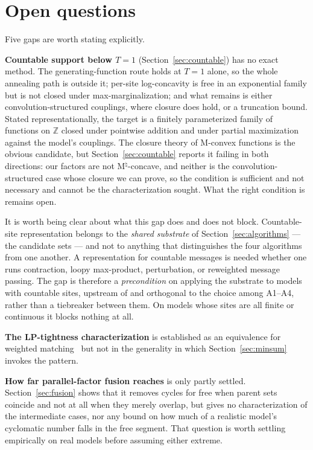 \section*{Open questions}

Five gaps are worth stating explicitly.

\textbf{Countable support below $T = 1$} (Section~\ref{sec:countable}) has no exact method. The generating-function route holds at $T = 1$ alone, so the whole annealing path is outside it; per-site log-concavity is free in an exponential family but is not closed under max-marginalization; and what remains is either convolution-structured couplings, where closure does hold, or a truncation bound. Stated representationally, the target is a finitely parameterized family of functions on $\mathbb{Z}$ closed under pointwise addition and under partial maximization against the model's couplings. The closure theory of M-convex functions is the obvious candidate, but Section~\ref{sec:countable} reports it failing in both directions: our factors are not M$^{\natural}$-concave, and neither is the convolution-structured case whose closure we can prove, so the condition is sufficient and not necessary and cannot be the characterization sought. What the right condition is remains open.

It is worth being clear about what this gap does and does not block. Countable-site representation belongs to the \emph{shared substrate} of Section~\ref{sec:algorithms} --- the candidate sets --- and not to anything that distinguishes the four algorithms from one another. A representation for countable messages is needed whether one runs contraction, loopy max-product, perturbation, or reweighted message passing. The gap is therefore a \emph{precondition} on applying the substrate to models with countable sites, upstream of and orthogonal to the choice among A1--A4, rather than a tiebreaker between them. On models whose sites are all finite or continuous it blocks nothing at all.

\textbf{The LP-tightness characterization} is established as an equivalence for weighted matching~\citep{Sanghavi2007} but not in the generality in which Section~\ref{sec:minsum} invokes the pattern.

\textbf{How far parallel-factor fusion reaches} is only partly settled. Section~\ref{sec:fusion} shows that it removes cycles for free when parent sets coincide and not at all when they merely overlap, but gives no characterization of the intermediate cases, nor any bound on how much of a realistic model's cyclomatic number falls in the free segment. That question is worth settling empirically on real models before assuming either extreme.

